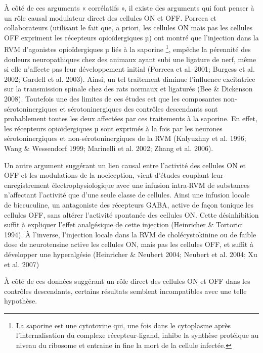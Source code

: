 \documentclass[a4paper,12pt,twoside]{report}
\begin{document}
\`A côté de ces arguments « corrélatifs », il existe des arguments qui font penser à un rôle causal modulateur direct des cellules ON et OFF. Porreca et collaborateurs (utilisant le fait que, a priori, les cellules ON mais pas les cellules OFF expriment les récepteurs opioïdergiques µ) ont montré que l’injection dans la RVM d’agonistes opioïdergiques µ liés à la saporine
\footnote{La saporine est une cytotoxine qui, une fois dans le cytoplasme après l’internalisation du complexe récepteur-ligand, inhibe la synthèse protéique au niveau du ribosome et entraine in fine la mort de la cellule infectée.}, 
empêche la pérennité des douleurs neuropathiques chez des animaux ayant subi une ligature de nerf, même si elle n’affecte pas leur développement initial (Porreca et al. 2001; Burgess et al. 2002; Gardell et al. 2003). Ainsi, un tel traitement diminue l’influence excitatrice sur la transmission spinale chez des rats normaux et ligaturés (Bee \& Dickenson 2008). Toutefois une des limites de ces études est que les composantes non-sérotoninergiques et sérotoninergiques des contrôles descendants sont probablement toutes les deux affectées par ces traitements à la saporine. En effet, les récepteurs opioïdergiques µ sont exprimés à la fois par les neurones sérotoninergiques et non-sérotoninergiques de la RVM (Kalyuzhny et al. 1996; Wang \& Wessendorf 1999; Marinelli et al. 2002; Zhang et al. 2006).

\bigskip

Un autre argument suggérant un lien causal entre l’activité des cellules ON et OFF et les modulations de la nociception, vient d’études couplant leur enregistrement électrophysiologique avec une infusion intra-RVM de substances n’affectant l’activité que d’une seule classe de cellules. Ainsi une infusion locale de biccuculine, un antagoniste des récepteurs GABA, active de façon tonique les cellules OFF, sans altérer l’activité spontanée des cellules ON. Cette désinhibition suffit à expliquer l’effet analgésique de cette injection (Heinricher \& Tortorici 1994). À l’inverse, l’injection locale dans la RVM de cholécystokinine ou de faible dose de neurotensine active les cellules ON, mais pas les cellules OFF, et suffit à développer une hyperalgésie (Heinricher \& Neubert 2004; Neubert et al. 2004; Xu et al. 2007)

\bigskip

\`A côté de ces données suggérant un rôle direct des cellules ON et OFF dans les contrôles descendants, certains résultats semblent incompatibles avec une telle hypothèse.
\end{document}
